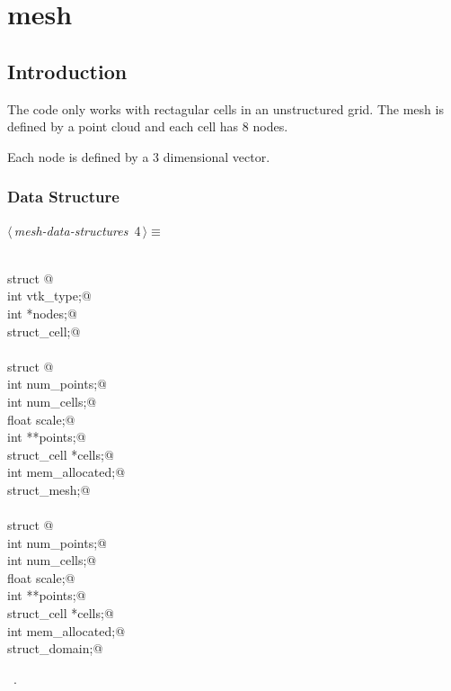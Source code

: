 \documentclass[a4paper,11pt]{article}
\begin{document}
\section{mesh}

\subsection{Introduction}
The code only works with rectagular cells in an unstructured grid. The mesh is defined by a point cloud and each cell has 8 nodes.

Each node is defined by a 3 dimensional vector.


\subsubsection{Data Structure}
\begin{flushleft} \small
\begin{minipage}{\linewidth}\label{scrap2}\raggedright\small
{} $\langle\,${\itshape mesh-data-structures}\nobreak\ {\footnotesize {4}}$\,\rangle\equiv$
\vspace{-1ex}
\begin{list}{}{} \item
\mbox{}\verb@@\\
\mbox{}\verb@typedef struct {@\\
\mbox{}\verb@    int vtk_type;@\\
\mbox{}\verb@    int *nodes;@\\
\mbox{}\verb@} struct_cell;@\\
\mbox{}\verb@@\\
\mbox{}\verb@typedef struct {@\\
\mbox{}\verb@    int num_points;@\\
\mbox{}\verb@    int num_cells;@\\
\mbox{}\verb@    float scale;@\\
\mbox{}\verb@    int **points;@\\
\mbox{}\verb@    struct_cell *cells;@\\
\mbox{}\verb@    int mem_allocated;@\\
\mbox{}\verb@} struct_mesh;@\\
\mbox{}\verb@@\\
\mbox{}\verb@typedef struct {@\\
\mbox{}\verb@    int num_points;@\\
\mbox{}\verb@    int num_cells;@\\
\mbox{}\verb@    float scale;@\\
\mbox{}\verb@    int **points;@\\
\mbox{}\verb@    struct_cell *cells;@\\
\mbox{}\verb@    int mem_allocated;@\\
\mbox{}\verb@} struct_domain;@\\
\mbox{}\verb@@{\NWsep}
\end{list}
\vspace{-1.5ex}
\footnotesize
\begin{list}{}{\setlength{\itemsep}{-\parsep}\setlength{\itemindent}{-\leftmargin}}
\item \NWtxtMacroRefIn\ .


\end{list}
\end{minipage}
\end{flushleft}
\end{document}
